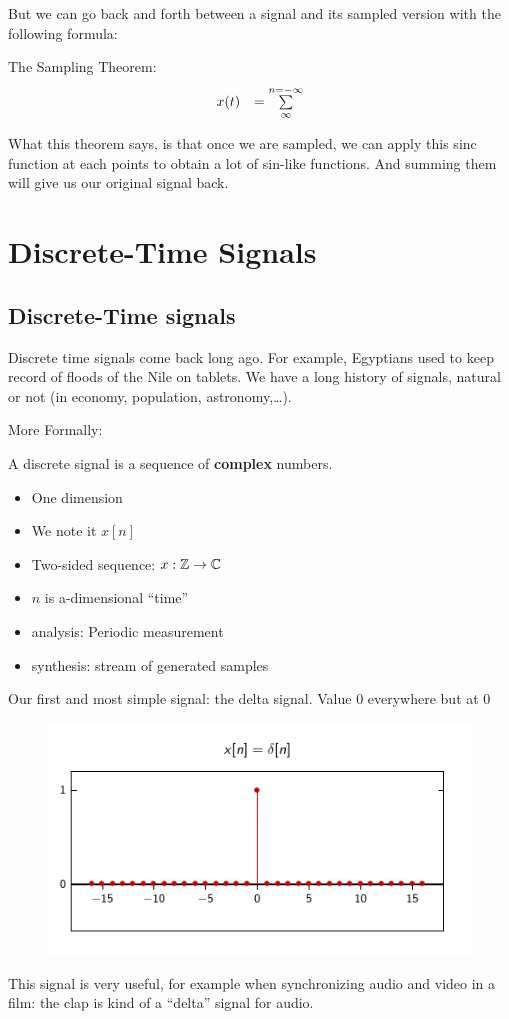 \documentclass[11pt,a4paper]{article}
\numberwithin{equation}{section}
\begin{document}
But we can go back and forth between a signal and its sampled version with the following formula:
\begin{boite}
    The Sampling Theorem:
    \begin{equation}
        \begin{array}{ll}
            x(t) &= \sum\limits_{\infty}^{n=-\infty}
        \end{array}
    \end{equation}
\end{boite}
What this theorem says, is that once we are sampled, we can apply this sinc function at each points to obtain a lot of sin-like functions. And summing them will give us our original signal back.

\section{Discrete-Time Signals}
\subsection{Discrete-Time signals}
Discrete time signals come back long ago. For example, Egyptians used to keep record of floods of the Nile on tablets. We have a long history of signals, natural or not (in economy, population, astronomy,\ldots). 

More Formally: 
\begin{boite}
    A discrete signal is a sequence of \textbf{complex} numbers.
    \begin{itemize}
        \item One dimension
        \item We note it $x[n]$
        \item Two-sided sequence: $x: \mathbb{Z} \to \mathbb{C}$
        \item $n$ is a-dimensional ``time''
        \item analysis: Periodic measurement
        \item synthesis: stream of generated samples
    \end{itemize}
\end{boite}
Our first and most simple signal: the delta signal. Value 0 everywhere but at 0
\begin{figure}
    \includegraphics[scale=0.6]{images/delta}
\end{figure}
This signal is very useful, for example when synchronizing audio and video in a film: the clap is kind of a ``delta'' signal for audio.
\end{document}
